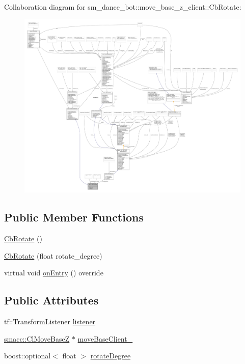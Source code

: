 Collaboration diagram for sm\+\_\+dance\+\_\+bot\+:\+:move\+\_\+base\+\_\+z\+\_\+client\+:\+:Cb\+Rotate\+:
\nopagebreak
\begin{figure}[H]
\begin{center}
\leavevmode
\includegraphics[width=350pt]{classsm__dance__bot_1_1move__base__z__client_1_1CbRotate__coll__graph}
\end{center}
\end{figure}
\subsection*{Public Member Functions}
\begin{DoxyCompactItemize}
\item 
\hyperlink{classsm__dance__bot_1_1move__base__z__client_1_1CbRotate_aa72878751abd7de8f9895b6ecfc3e1f7}{Cb\+Rotate} ()
\item 
\hyperlink{classsm__dance__bot_1_1move__base__z__client_1_1CbRotate_ab706ef8ad745f3b293f065e3f625f6dd}{Cb\+Rotate} (float rotate\+\_\+degree)
\item 
virtual void \hyperlink{classsm__dance__bot_1_1move__base__z__client_1_1CbRotate_a61a2c0d99f36e0ce6d5b51ed4f231dca}{on\+Entry} () override
\end{DoxyCompactItemize}
\subsection*{Public Attributes}
\begin{DoxyCompactItemize}
\item 
tf\+::\+Transform\+Listener \hyperlink{classsm__dance__bot_1_1move__base__z__client_1_1CbRotate_a378ab8e6db83063793e07f8ebdae6d2c}{listener}
\item 
\hyperlink{classsmacc_1_1ClMoveBaseZ}{smacc\+::\+Cl\+Move\+BaseZ} $\ast$ \hyperlink{classsm__dance__bot_1_1move__base__z__client_1_1CbRotate_acf8790630271d1180e2b9936edc4eb79}{move\+Base\+Client\+\_\+}
\item 
boost\+::optional$<$ float $>$ \hyperlink{classsm__dance__bot_1_1move__base__z__client_1_1CbRotate_ab1ecbec2a3e65f6339d176f440e2e2f3}{rotate\+Degree}
\end{DoxyCompactItemize}


